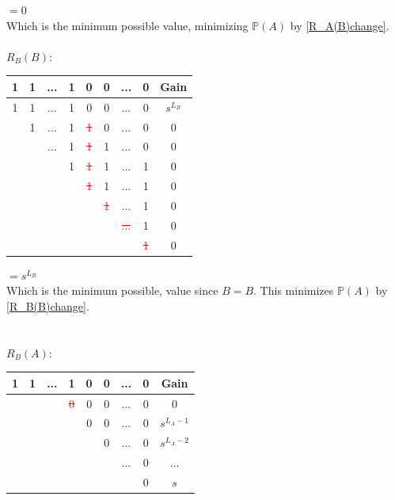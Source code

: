 \documentclass[english,12pt,a4paper,final]{article}
\begin{document}
$=0$
\\
Which is the minimum possible value, minimizing $\mathbb{P}(A)$ by \eqref{R_A(B)change}.
\\\\
${R_B(B)}$:
\begin{tabular}{|cccccccc|c|}
	\hline
	1 & 1 & ... & 1 & 0 & 0 & ... & 0 & Gain \\
	\hline
	
	\textcolor{OliveGreen}{1} & \textcolor{OliveGreen}{1} & \textcolor{OliveGreen}{...} & \textcolor{OliveGreen}{1} & \textcolor{OliveGreen}{0} & \textcolor{OliveGreen}{0} & \textcolor{OliveGreen}{...} & \textcolor{OliveGreen}{0} & $s^{L_B}$\\
	
	& \textcolor{OliveGreen}{1} & \textcolor{OliveGreen}{...} & \textcolor{OliveGreen}{1} & \textcolor{red}{\sout{1}} & 0 & ... & 0 & $0$ \\
	
	&  & \textcolor{OliveGreen}{...} & \textcolor{OliveGreen}{1} & \textcolor{red}{\sout{1}} & 1 & ... & 0 & $0$ \\
	
	&  &  & \textcolor{OliveGreen}{1} & \textcolor{red}{\sout{1}} & 1 & ... & 1 & $0$ \\
	
	&  &  &  & \textcolor{red}{\sout{1}} & 1 & ... & 1 & $0$ \\
	
	&  &  &  &  & \textcolor{red}{\sout{1}} & ... & 1 & $0$ \\
	
	&  &  &  &  &  & \textcolor{red}{\sout{...}} & 1 & $0$ \\
	
	&  &  &  &  &  &  & \textcolor{red}{\sout{1}} & $0$ \\
	\hline
\end{tabular}
$=s^{L_B}$
\\
Which is the minimum possible, value since $B=B$. This minimizes $\mathbb{P}(A)$ by \eqref{R_B(B)change}.
\\\\\\
${R_B(A)}$:
\begin{tabular}{|cccccccc|c|}
	\hline
	1 & 1 & ... & 1 & 0 & 0 & ... & 0 & Gain \\
	\hline
	
	& & & \textcolor{red}{\sout{0}} & 0 & 0 & ... & 0 & $0$\\
	
	& & & & \textcolor{OliveGreen}{0} & \textcolor{OliveGreen}{0} & \textcolor{OliveGreen}{...} & \textcolor{OliveGreen}{0} & $s^{L_A-1}$ \\
	
	& & & & & \textcolor{OliveGreen}{0} & \textcolor{OliveGreen}{...} & \textcolor{OliveGreen}{0} & $s^{L_A-2}$ \\
	
	& & & & & & \textcolor{OliveGreen}{...} & \textcolor{OliveGreen}{0} & $...$ \\
	
	&  &  &  &  & &  & \textcolor{OliveGreen}{0} & $s$ \\
	\hline
\end{tabular}
\end{document}
